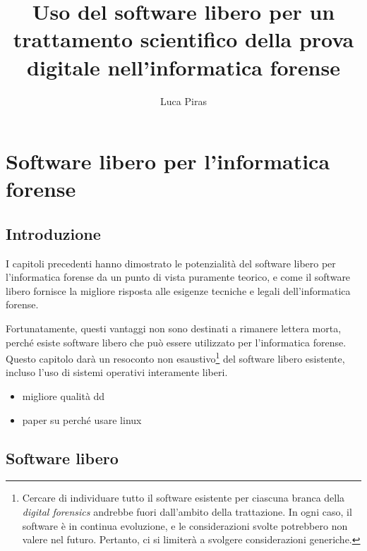 \documentclass[
  12pt,
  a4paper,
]{book}
\title{Uso del software libero per un trattamento scientifico della
prova digitale nell'informatica forense}
\author{Luca Piras}
\date{}
\providecommand{\tightlist}{%
  \setlength{\itemsep}{0pt}\setlength{\parskip}{0pt}}
\begin{document}
\frontmatter
\maketitle

{
\setcounter{tocdepth}{2}
\tableofcontents
}
\mainmatter
\newcommand{\Omissis}{[\dots\unkern]}
\newcommand{\VediRef}[1]{\footnote{V. sez. \ref{#1}.}}
\newcommand{\VediAdEsempioUrl}[1]{\footnote{V., ad es., \url{#1}.}}
\newcommand{\AutoreTitoloAnnoUrl}[4]{{#1}, \emph{#2}, {#3}, \url{#4}}
\newcommand{\VediUrl}[4]{V. \AutoreTitoloAnnoUrl{#1}{#2}{#3}{#4}}
\newcommand{\vediUrl}[4]{v. \AutoreTitoloAnnoUrl{#1}{#2}{#3}{#4}}

\chapter{Software libero per l'informatica
forense}\label{software-libero-per-linformatica-forense}

\section{Introduzione}\label{introduzione}

I capitoli precedenti hanno dimostrato le potenzialità del software
libero per l'informatica forense da un punto di vista puramente teorico,
e come il software libero fornisce la migliore risposta alle esigenze
tecniche e legali dell'informatica forense.

Fortunatamente, questi vantaggi non sono destinati a rimanere lettera
morta, perché esiste software libero che può essere utilizzato per
l'informatica forense. Questo capitolo darà un resoconto non
esaustivo\footnote{Cercare di individuare tutto il software esistente
  per ciascuna branca della \emph{digital forensics} andrebbe fuori
  dall'ambito della trattazione. In ogni caso, il software è in continua
  evoluzione, e le considerazioni svolte potrebbero non valere nel
  futuro. Pertanto, ci si limiterà a svolgere considerazioni generiche.}
del software libero esistente, incluso l'uso di sistemi operativi
interamente liberi.

\begin{itemize}
\tightlist
\item
  migliore qualità dd
\item
  paper su perché usare linux
\end{itemize}

\section{Software libero}\label{software-libero}
\end{document}
